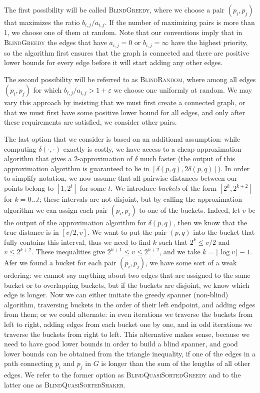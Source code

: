 \documentclass[a4paper,USenglish]{socg-lipics-v2018}
\newcommand{\eps}{\varepsilon}
\newcommand{\dist}{\delta}
\begin{document}
The first possibility will be called \textsc{BlindGreedy}, where we choose a pair $(p_i, p_j)$ that maximizes
the ratio $b_{i,j} / a_{i,j}$. If the number of maximizing pairs is more than 1, we choose one of them at random.
Note that our conventions imply that in \textsc{BlindGreedy} the edges that have $a_{i,j} = 0$ or $b_{i,j} = \infty$
have the highest priority, so the algorithm first ensures that the graph is connected and there are positive
lower bounds for every edge before it will start adding any other edges.



The second possibility will be referred to as \textsc{BlindRandom}, where among all edges $(p_i, p_j)$
for which $b_{i,j} / a_{i,j} > 1 + \eps$ we choose one uniformly at random. We may vary this approach
by insisting that we must first create a connected graph, or that we must first have some positive lower bound
for all edges, and only after these requirements are satisfied, we consider other pairs.



The last option that we consider is based on an additional assumption: while
computing $\dist(\cdot, \cdot)$ exactly is costly, we have access to a
cheap approximation algorithm
that gives a $2$-approximation of $\dist$ much faster 
(the output of this approximation algorithm is guaranteed to
lie in $[\dist(p,q), 2 \dist(p,q)]$). In order to simplify notation, we now assume
that all pairwise distances between our points belong to $[1, 2^t]$ for some $t$.
We introduce \textit{buckets} of the form $[2^k, 2^{k+2}]$ for $k = 0 \dots t$;
these intervals are not disjoint, but by calling the approximation algorithm we can assign
each pair $(p_i, p_j)$ to one of the buckets.
Indeed, let $v$ be the output of the approximation algorithm for $\dist(p,q)$,
then we know that the true distance is in $[v/2, v]$. We want to put the pair $(p,q)$ into the bucket
that fully contains this interval, thus we need to find $k$ such that
$2^k \leq v /2$ and $v \leq 2^{k+2}$. These inequalities give $ 2^{k+1} \leq v \leq 2^{k+2}$,
and we take $k = \lfloor \log v \rfloor - 1$.
Afer we found a bucket for each pair $(p_i, p_j)$, 
we have some sort of a weak ordering: we cannot say anything
about two edges that are assigned to the same bucket or to overlapping buckets, but if the buckets
are disjoint, we know which edge is longer. Now we can either imitate the greedy spanner (non-blind) algorithm,
traversing buckets in the order of their left endpoint, and adding edges from them; or we could alternate: in even iterations
we traverse the buckets from left to right, adding edges from each bucket one by one, and in odd iterations
we traverse the buckets from right to left. This alternative makes sense, because we need to have good lower bounds in
order to build a blind spanner, and good lower bounds can be obtained from the triangle inequality, if one of the edges 
in a path connecting $p_i$ and $p_j$ in $G$ is longer than the sum of the lengths of all other edges.
We refer to the former option as \textsc{BlindQuasiSortedGreedy} and to the latter one as \textsc{BlindQuasiSortedShaker}.
\end{document}
